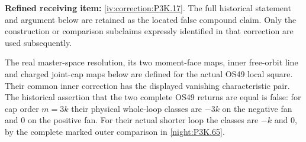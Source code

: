 \begin{theorem}\hypertarget{tag-02TW}{}\label{night:P3K.17}

\par\noindent\textbf{Refined receiving item:} \cref{iv:correction:P3K.17}. The full historical statement and argument below are retained as the located false compound claim. Only the construction or comparison subclaims expressly identified in that correction are used subsequently.

The real master-space resolution, its two moment-face maps,
inner free-orbit line and charged joint-cap maps below are defined
for the actual OS49 local square. Their common inner correction
has the displayed vanishing characteristic pair. The historical
assertion that the two complete OS49 returns are equal is false:
for cap order \(m=3k\) their physical whole-loop classes are
\(-3k\) on the negative fan and \(0\) on the positive fan.
For their actual shorter loop the classes are \(-k\) and \(0\),
by the complete marked outer comparison in \cref{night:P3K.65}.
\end{theorem}

